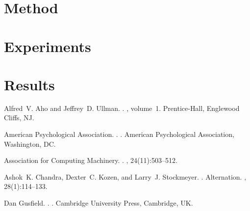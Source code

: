 \documentclass[11pt]{article}
\begin{document}
\section{Method}


\section{Experiments}


\section{Results}


% 

\begin{thebibliography}{}

 Alfred~V. Aho and
    Jeffrey~D. Ullman.  .  , volume~1.  \newblock Prentice-{Hall}, Englewood
    Cliffs, NJ.

    {American Psychological Association}.  .  .  \newblock American Psychological Association,
    Washington, DC.

    {Association for Computing Machinery}.  .  , 24(11):503--512.

    Ashok~K. Chandra, Dexter~C. Kozen, and Larry~J. Stockmeyer.  .  \newblock Alternation.  , 28(1):114--133.

 Dan Gusfield.  .  .
    \newblock Cambridge University Press, Cambridge, UK.

\end{thebibliography}
\end{document}
